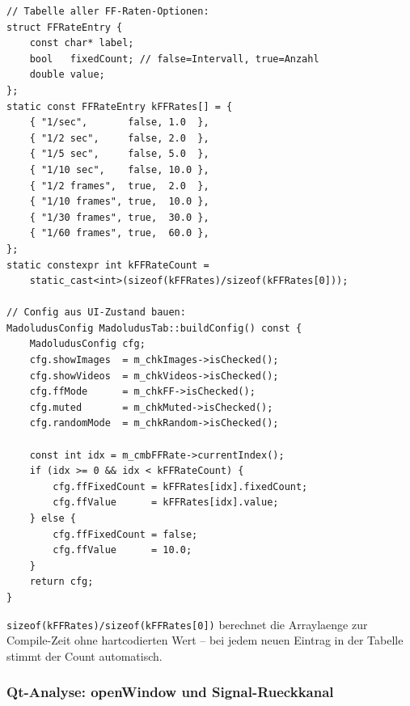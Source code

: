 \begin{lstlisting}[caption={FF-Rate-Tabelle und buildConfig}]
// Tabelle aller FF-Raten-Optionen:
struct FFRateEntry {
    const char* label;
    bool   fixedCount; // false=Intervall, true=Anzahl
    double value;
};
static const FFRateEntry kFFRates[] = {
    { "1/sec",       false, 1.0  },
    { "1/2 sec",     false, 2.0  },
    { "1/5 sec",     false, 5.0  },
    { "1/10 sec",    false, 10.0 },
    { "1/2 frames",  true,  2.0  },
    { "1/10 frames", true,  10.0 },
    { "1/30 frames", true,  30.0 },
    { "1/60 frames", true,  60.0 },
};
static constexpr int kFFRateCount =
    static_cast<int>(sizeof(kFFRates)/sizeof(kFFRates[0]));

// Config aus UI-Zustand bauen:
MadoludusConfig MadoludusTab::buildConfig() const {
    MadoludusConfig cfg;
    cfg.showImages  = m_chkImages->isChecked();
    cfg.showVideos  = m_chkVideos->isChecked();
    cfg.ffMode      = m_chkFF->isChecked();
    cfg.muted       = m_chkMuted->isChecked();
    cfg.randomMode  = m_chkRandom->isChecked();

    const int idx = m_cmbFFRate->currentIndex();
    if (idx >= 0 && idx < kFFRateCount) {
        cfg.ffFixedCount = kFFRates[idx].fixedCount;
        cfg.ffValue      = kFFRates[idx].value;
    } else {
        cfg.ffFixedCount = false;
        cfg.ffValue      = 10.0;
    }
    return cfg;
}
\end{lstlisting}

\verb|sizeof(kFFRates)/sizeof(kFFRates[0])| berechnet
die Arraylaenge zur Compile-Zeit ohne hartcodierten Wert --
bei jedem neuen Eintrag in der Tabelle stimmt der Count
automatisch.

\subsubsection{Qt-Analyse: openWindow und Signal-Rueckkanal}

